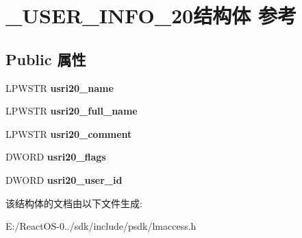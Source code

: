 \hypertarget{struct___u_s_e_r___i_n_f_o__20}{}\section{\+\_\+\+U\+S\+E\+R\+\_\+\+I\+N\+F\+O\+\_\+20结构体 参考}
\label{struct___u_s_e_r___i_n_f_o__20}
\subsection*{Public 属性}
\begin{DoxyCompactItemize}
\item 
\mbox{\label{struct___u_s_e_r___i_n_f_o__20_a148b0bd07819d0f451e13d958d3efa8e}} 
L\+P\+W\+S\+TR {\bfseries usri20\+\_\+name}
\item 
\mbox{\label{struct___u_s_e_r___i_n_f_o__20_a274af73b06faa6369a370678dd71d62d}} 
L\+P\+W\+S\+TR {\bfseries usri20\+\_\+full\+\_\+name}
\item 
\mbox{\label{struct___u_s_e_r___i_n_f_o__20_a872b4cdd484fdafd06d59dfb5d9e1f3a}} 
L\+P\+W\+S\+TR {\bfseries usri20\+\_\+comment}
\item 
\mbox{\label{struct___u_s_e_r___i_n_f_o__20_a8cbc5c2255afd4c958890fe837d55d43}} 
D\+W\+O\+RD {\bfseries usri20\+\_\+flags}
\item 
\mbox{\label{struct___u_s_e_r___i_n_f_o__20_a709a5f1b7420acb62e3854aa16bdc759}} 
D\+W\+O\+RD {\bfseries usri20\+\_\+user\+\_\+id}
\end{DoxyCompactItemize}


该结构体的文档由以下文件生成\+:\begin{DoxyCompactItemize}
\item 
E\+:/\+React\+O\+S-\/0../sdk/include/psdk/lmaccess.\+h\end{DoxyCompactItemize}
